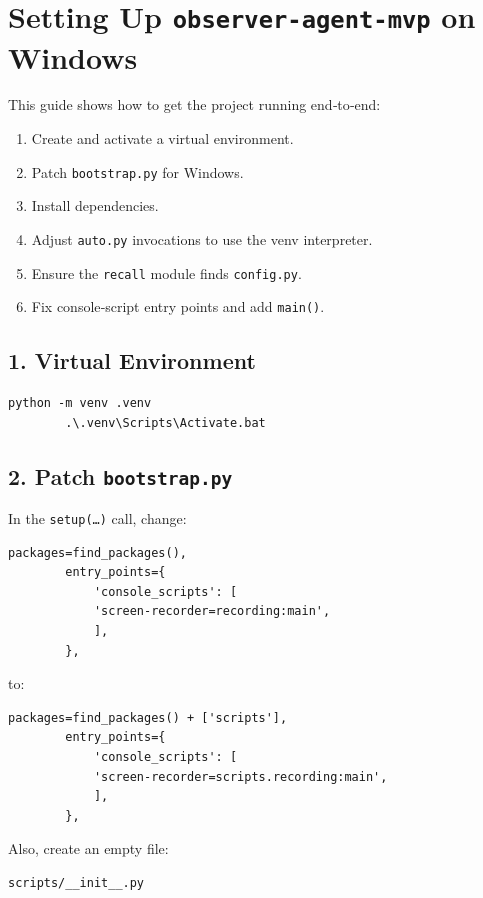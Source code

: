 \documentclass{article}
\begin{document}
	
	\section*{Setting Up \texttt{observer-agent-mvp} on Windows}
	
	This guide shows how to get the project running end‐to‐end:
	
	\begin{enumerate}
		\item Create and activate a virtual environment.
		\item Patch \texttt{bootstrap.py} for Windows.
		\item Install dependencies.
		\item Adjust \texttt{auto.py} invocations to use the venv interpreter.
		\item Ensure the \texttt{recall} module finds \texttt{config.py}.
		\item Fix console‐script entry points and add \texttt{main()}.
	\end{enumerate}
	
	\subsection*{1. Virtual Environment}
	
	\begin{lstlisting}[frame=none]
		python -m venv .venv
		.\.venv\Scripts\Activate.bat
	\end{lstlisting}
	
	\subsection*{2. Patch \texttt{bootstrap.py}}
	
	In the \texttt{setup(…)} call, change:
	\begin{lstlisting}[frame=none]
		packages=find_packages(),
		entry_points={
			'console_scripts': [
			'screen-recorder=recording:main',
			],
		},
	\end{lstlisting}
	to:
	\begin{lstlisting}[frame=none]
		packages=find_packages() + ['scripts'],
		entry_points={
			'console_scripts': [
			'screen-recorder=scripts.recording:main',
			],
		},
	\end{lstlisting}
	Also, create an empty file:
	\begin{lstlisting}[frame=none]
		scripts/__init__.py
	\end{lstlisting}
	
\end{document}
